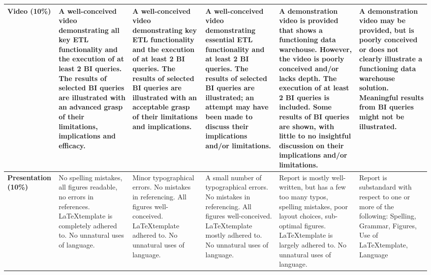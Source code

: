 \documentclass{article}[a4paper,12pt]
\begin{document}
\begin{landscape}
\begin{center}
\begin{longtable}{|p{.15\linewidth}||*5{p{.15\linewidth}|}}
	\textbf{Video (10\%)} 
	& A well-conceived video demonstrating all key ETL functionality and the execution of at least 2 BI queries. The results of selected BI queries are illustrated with an advanced grasp of their limitations, implications and efficacy.
 	& A well-conceived video demonstrating key ETL functionality and the execution of at least 2 BI queries. The results of selected BI queries are illustrated with an acceptable grasp of their limitations and implications.
	& A well-conceived video demonstrating essential ETL functionality and at least 2 BI queries. The results of selected BI queries are illustrated; an attempt may have been made to discuss their implications and/or limitations.
	& A demonstration video is provided that shows a functioning data warehouse. However, the video is poorly conceived and/or lacks depth. The execution of at least 2 BI queries is included. Some results of BI queries are shown, with little to no insightful discussion on their implications and/or limitations.
 & A demonstration video may be provided, but is poorly conceived or does not clearly illustrate a functioning data warehouse solution. Meaningful results from BI queries might not be illustrated.
\\\hline
	
	\textbf{Presentation (10\%)}
	& No spelling mistakes, all figures readable, no errors in references. \LaTeX template is completely adhered to. No unnatural uses of language.
	& Minor typographical errors. No mistakes in referencing. All figures well-conceived. \LaTeX template adhered to. No unnatural uses of language.
	& A small number of typographical errors. No mistakes in referencing. All figures well-conceived. \LaTeX template mostly adhered to. No unnatural uses of language.
	& Report is mostly well-written, but has a few too many typos, spelling mistakes, poor layout choices, sub-optimal figures. \LaTeX template is largely adhered to. No unnatural uses of language.
	& Report is substandard with respect to one or more of the following: Spelling, Grammar, Figures, Use of \LaTeX template, Language
	\\\hline
	    \hline

\end{longtable}
\end{center}
\end{landscape}
\end{document}
